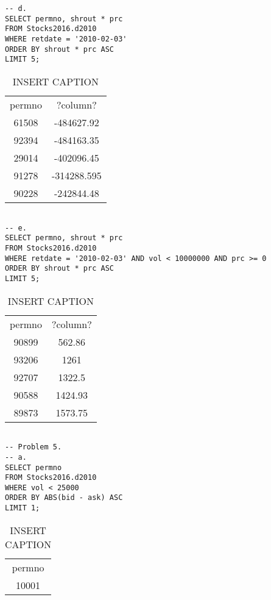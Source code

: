 \documentclass[12 pt]{article}
\begin{document}
\begin{flushleft}
\begin{verbatim}
-- d.
SELECT permno, shrout * prc
FROM Stocks2016.d2010
WHERE retdate = '2010-02-03'
ORDER BY shrout * prc ASC
LIMIT 5; 
 \end{verbatim} 
\begin{table}[h] 
\centering 
\caption{INSERT CAPTION} 
\label{my - label} 
\begin{tabular}{c c } 
\\
permno & ?column?\\
61508 & -484627.92\\
92394 & -484163.35\\
29014 & -402096.45\\
91278 & -314288.595\\
90228 & -242844.48\\
\end{tabular} 
 \end{table} \begin{verbatim} 

-- e.
SELECT permno, shrout * prc
FROM Stocks2016.d2010
WHERE retdate = '2010-02-03' AND vol < 10000000 AND prc >= 0
ORDER BY shrout * prc ASC
LIMIT 5; 
 \end{verbatim} 
\begin{table}[h] 
\centering 
\caption{INSERT CAPTION} 
\label{my - label} 
\begin{tabular}{c c } 
\\
permno & ?column?\\
90899 & 562.86\\
93206 & 1261\\
92707 & 1322.5\\
90588 & 1424.93\\
89873 & 1573.75\\
\end{tabular} 
 \end{table} \begin{verbatim} 

-- Problem 5.
-- a.
SELECT permno
FROM Stocks2016.d2010
WHERE vol < 25000
ORDER BY ABS(bid - ask) ASC
LIMIT 1; 
 \end{verbatim} 
\begin{table}[h] 
\centering 
\caption{INSERT CAPTION} 
\label{my - label} 
\begin{tabular}{c } 
\\
permno\\
10001\\
\end{tabular} 
 \end{table} \begin{verbatim} 


\end{verbatim}
\end{flushleft}
\end{document}
